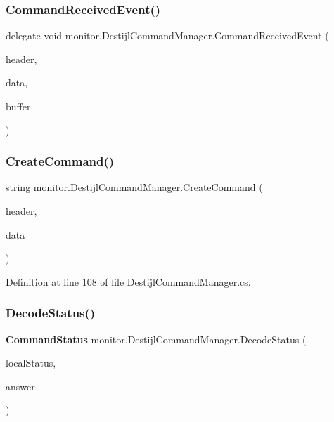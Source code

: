 \subsubsection{Command\+Received\+Event()}
{\footnotesize\ttfamily delegate void monitor.\+Destijl\+Command\+Manager.\+Command\+Received\+Event (\begin{DoxyParamCaption}\item[{string}]{header,  }\item[{string}]{data,  }\item[{byte [$\,$]}]{buffer }\end{DoxyParamCaption})}

\mbox{\label{classmonitor_1_1_destijl_command_manager_a47eb72ec1ae43505966bc5cf09c79e58}} 
\subsubsection{Create\+Command()}
{\footnotesize\ttfamily string monitor.\+Destijl\+Command\+Manager.\+Create\+Command (\begin{DoxyParamCaption}\item[{string}]{header,  }\item[{string}]{data }\end{DoxyParamCaption})\hspace{0.3cm}{\ttfamily [private]}}



Definition at line 108 of file Destijl\+Command\+Manager.\+cs.

\mbox{\label{classmonitor_1_1_destijl_command_manager_a00c3fb9f163c4d9025b356a5a7e74012}} 
\subsubsection{Decode\+Status()}
{\footnotesize\ttfamily \textbf{ Command\+Status} monitor.\+Destijl\+Command\+Manager.\+Decode\+Status (\begin{DoxyParamCaption}\item[{\textbf{ Command\+Manager.\+Command\+Manager\+Status}}]{local\+Status,  }\item[{string}]{answer }\end{DoxyParamCaption})\hspace{0.3cm}{\ttfamily [private]}}



